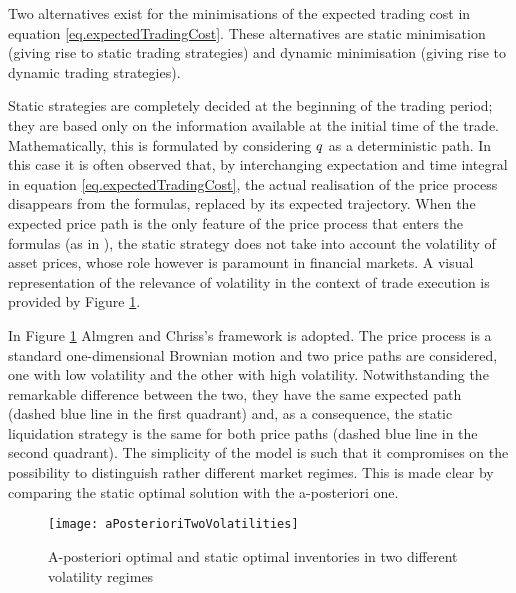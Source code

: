 \documentclass[10pt,a4paper]{article}
\begin{document}
	Two alternatives exist for the minimisations of the expected trading cost in equation \eqref{eq.expectedTradingCost}. These alternatives are static minimisation (giving rise to static trading strategies) and dynamic minimisation (giving rise to dynamic trading strategies).
	
	Static strategies are  completely decided at the beginning of the trading period; they are based only on the information available  at the initial time of the trade. Mathematically, this is formulated by considering $q$ as a deterministic path. In this case it is often observed that,  by interchanging expectation and time integral in equation \eqref{eq.expectedTradingCost}, the actual realisation of the price process disappears from the formulas, replaced by its expected trajectory.  When the expected price path is the only feature of the price process that enters the formulas (as in \cite{AC00opt}), the static strategy does not take into account the volatility of asset prices, whose role however is paramount in financial markets.  A visual representation of the relevance of volatility in the context of trade execution is provided by Figure \ref{fig.aPosterioriTwoVolatilities}.
	
	In Figure \ref{fig.aPosterioriTwoVolatilities} Almgren and Chriss's framework is adopted. The price process is  a standard one-dimensional Brownian motion and two price paths are considered, one with low volatility and the other with high volatility. Notwithstanding the remarkable difference between the two, they have the same expected path (dashed blue line in the first quadrant) and, as a consequence, the static liquidation strategy is the same for both price paths (dashed blue line in the second quadrant).  The simplicity of the model is such that it compromises on the possibility to distinguish rather different market regimes. This is made clear by comparing the static optimal solution with the a-posteriori one.
	
	\begin{figure}
		\centering
		\texttt{[image: aPosterioriTwoVolatilities]}
		\caption{{A-posteriori optimal and static optimal inventories in two different volatility regimes}}
		\label{fig.aPosterioriTwoVolatilities}
	\end{figure}
	
\end{document}
